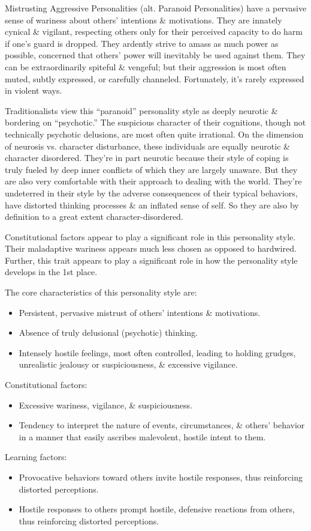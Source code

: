 \documentclass{article}
\numberwithin{equation}{section}
\begin{document}
Mistrusting Aggressive Personalities (alt. Paranoid Personalities) have a pervasive sense of wariness about others' intentions \& motivations. They are innately cynical \& vigilant, respecting others only for their perceived capacity to do harm if one's guard is dropped. They ardently strive to amass as much power as possible, concerned that others' power will inevitably be used against them. They can be extraordinarily spiteful \& vengeful; but their aggression is most often muted, subtly expressed, or carefully channeled. Fortunately, it's rarely expressed in violent ways.

Traditionalists view this ``paranoid'' personality style as deeply neurotic \& bordering on ``psychotic.'' The suspicious character of their cognitions, though not technically psychotic delusions, are most often quite irrational. On the dimension of neurosis vs. character disturbance, these individuals are equally neurotic \& character disordered. They're in part neurotic because their style of coping is truly fueled by deep inner conflicts of which they are largely unaware. But they are also very comfortable with their approach to dealing with the world. They're undeterred in their style by the adverse consequences of their typical behaviors, have distorted thinking processes \& an inflated sense of self. So they are also by definition to a great extent character-disordered.

Constitutional factors appear to play a significant role in this personality style. Their maladaptive wariness appears much less chosen as opposed to hardwired. Further, this trait appears to play a significant role in how the personality style develops in the 1st place.

The core characteristics of this personality style are:
\begin{itemize}
	\item Persistent, pervasive mistrust of others' intentions \& motivations.
	\item Absence of truly delusional (psychotic) thinking.
	\item Intensely hostile feelings, most often controlled, leading to holding grudges, unrealistic jealousy or suspiciousness, \& excessive vigilance.
\end{itemize}
Constitutional factors:
\begin{itemize}
	\item Excessive wariness, vigilance, \& suspiciousness.
	\item Tendency to interpret the nature of events, circumstances, \& others' behavior in a manner that easily ascribes malevolent, hostile intent to them.
\end{itemize}
Learning factors:
\begin{itemize}
	\item Provocative behaviors toward others invite hostile responses, thus reinforcing distorted perceptions.
	\item Hostile responses to others prompt hostile, defensive reactions from others, thus reinforcing distorted perceptions.
\end{itemize}
\end{document}
